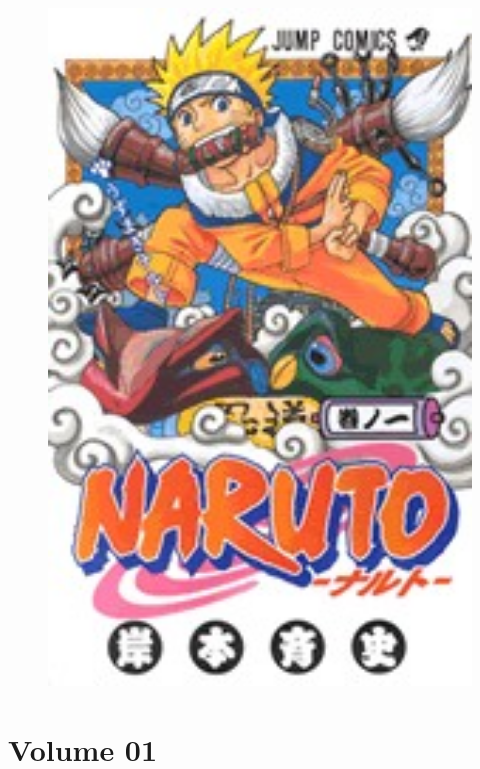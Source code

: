 \documentclass[
10pt,				%
openright,			%
oneside,			%
a5paper,			%
brazil,				%
french,				%
english,			%
sumario=tradicional
]{abntex2}
\begin{document}
\begin{figure}[h!]
	\centering
	\includegraphics[width=1\textwidth]{imgs/img_cap_volume_one.jpg}
\end{figure}

\maketitle
\tableofcontents
\part{Volume 01}
\end{document}
